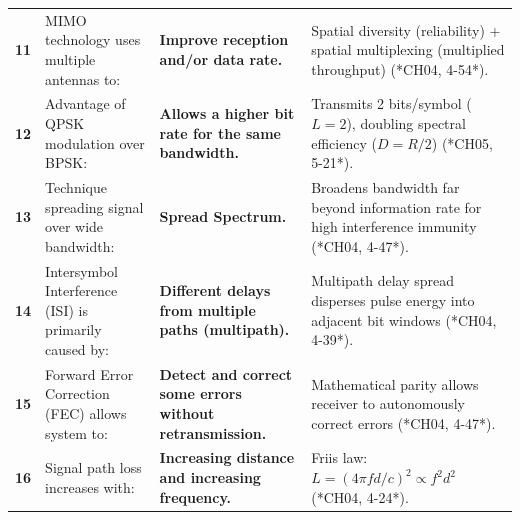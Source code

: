 \documentclass[10pt,a4paper]{article}
\begin{document}
\begin{center}
\begin{tabular}{p{0.5cm} p{6.8cm} p{4.2cm} p{5.5cm}}
\textbf{11} & MIMO technology uses multiple antennas to: & \textbf{Improve reception and/or data rate.} & Spatial diversity (reliability) + spatial multiplexing (multiplied throughput) (*CH04, 4-54*). \\
\textbf{12} & Advantage of QPSK modulation over BPSK: & \textbf{Allows a higher bit rate for the same bandwidth.} & Transmits 2 bits/symbol ($L = 2$), doubling spectral efficiency ($D = R/2$) (*CH05, 5-21*). \\
\textbf{13} & Technique spreading signal over wide bandwidth: & \textbf{Spread Spectrum.} & Broadens bandwidth far beyond information rate for high interference immunity (*CH04, 4-47*). \\
\textbf{14} & Intersymbol Interference (ISI) is primarily caused by: & \textbf{Different delays from multiple paths (multipath).} & Multipath delay spread disperses pulse energy into adjacent bit windows (*CH04, 4-39*). \\
\textbf{15} & Forward Error Correction (FEC) allows system to: & \textbf{Detect and correct some errors without retransmission.} & Mathematical parity allows receiver to autonomously correct errors (*CH04, 4-47*). \\
\textbf{16} & Signal path loss increases with: & \textbf{Increasing distance and increasing frequency.} & Friis law: $L = (4\pi f d / c)^2 \propto f^2 d^2$ (*CH04, 4-24*). \\
\bottomrule
\end{tabular}
\end{center}

\vspace{2pt}

\par\vspace{2pt}
\end{document}
